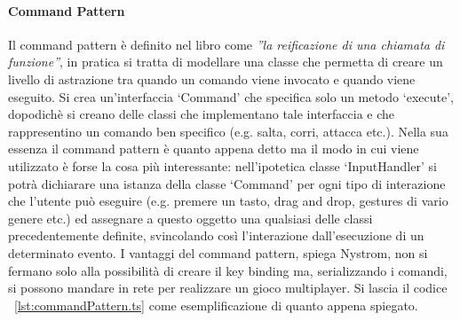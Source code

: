 \paragraph{Command Pattern}
Il command pattern è definito nel libro come \textit{''la reificazione 
di una chiamata di funzione''}, in pratica si tratta di modellare una classe
che permetta di creare un livello di astrazione tra quando un comando
viene invocato e quando viene eseguito. Si crea un'interfaccia `Command'
che specifica solo un metodo `execute', dopodichè si creano delle classi
che implementano tale interfaccia e che rappresentino un comando ben specifico
(e.g. salta, corri, attacca etc.). Nella sua essenza il command pattern è quanto
appena detto ma il modo in cui viene utilizzato è forse la cosa più interessante:
nell'ipotetica classe `InputHandler' si potrà dichiarare una istanza della classe
`Command' per ogni tipo di interazione che l'utente può eseguire (e.g. premere un tasto,
drag and drop, gestures di vario genere etc.) ed assegnare a questo oggetto una qualsiasi
delle classi precedentemente definite, svincolando così l'interazione dall'esecuzione
di un determinato evento. I vantaggi del command pattern, spiega Nystrom, non si
fermano solo alla possibilità di creare il key binding ma, serializzando i comandi,
si possono mandare in rete per realizzare un gioco multiplayer. Si lascia il codice
~\ref{lst:commandPattern.ts} come esemplificazione di quanto appena spiegato.

